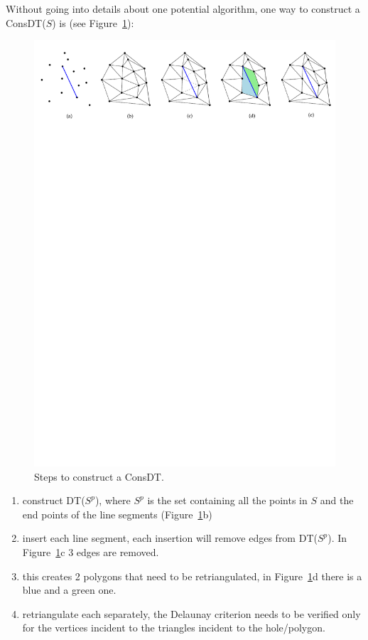 %

Without going into details about one potential algorithm, one way to construct a ConsDT($S$) is (see Figure~\ref{fig:cdt_steps}):
\begin{figure}
  \centering
  \includegraphics[width=0.95\linewidth]{figs/cdt_steps}
  \caption{Steps to construct a ConsDT.}%
\label{fig:cdt_steps}
\end{figure}
\begin{enumerate}
  \item construct DT($S^p$), where $S^p$ is the set containing all the points in $S$ and the end points of the line segments (Figure~\ref{fig:cdt_steps}b)
  \item insert each line segment, each insertion will remove edges from DT($S^p$). In Figure~\ref{fig:cdt_steps}c 3 edges are removed.
  \item this creates 2 polygons that need to be retriangulated, in Figure~\ref{fig:cdt_steps}d there is a blue and a green one.
  \item retriangulate each separately, the Delaunay criterion needs to be verified only for the vertices incident to the triangles incident to the hole/polygon.
\end{enumerate}

